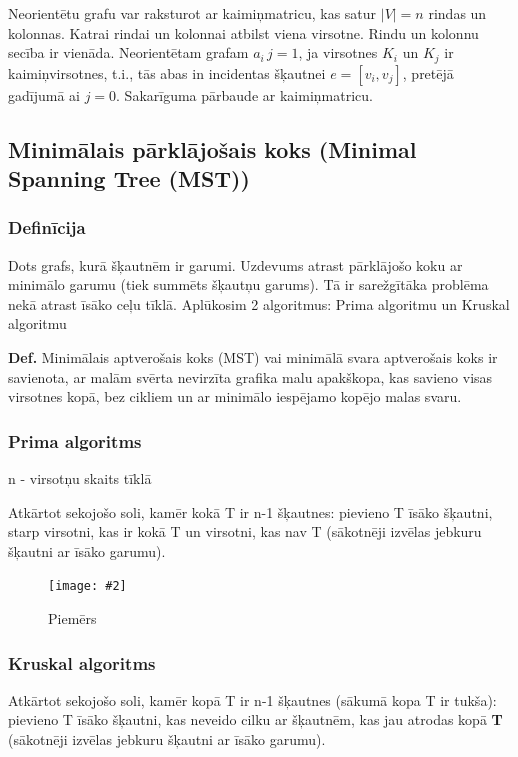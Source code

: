 \documentclass{article}
\newcommand{\illustration}[3]{
	\begin{figure}[H]
		\centering	
		\texttt{[image: \#2]}
		\caption{#3}
	\end{figure}
}
\begin{document}
Neorientētu grafu var raksturot ar kaimiņmatricu, kas satur $|V | = n$ rindas un kolonnas.  Katrai rindai un kolonnai atbilst viena virsotne.  Rindu un kolonnu secība ir vienāda.  Neorientētam grafam $a_i \, j = 1$, ja virsotnes $K_i$ un $K_j$ ir kaimiņvirsotnes, t.i., tās abas in incidentas šķautnei $e = [v_i , v_j ]$, pretējā gadījumā ai $j = 0$.  Sakarīguma pārbaude ar kaimiņmatricu.

\subsection{Minimālais pārklājošais koks (Minimal Spanning Tree (MST))}

\subsubsection{Definīcija}

Dots grafs, kurā šķautnēm ir garumi. Uzdevums atrast pārklājošo koku ar minimālo garumu (tiek summēts šķautņu garums).  Tā ir sarežgītāka problēma nekā atrast īsāko ceļu tīklā. Aplūkosim 2 algoritmus: Prima algoritmu un Kruskal algoritmu

\textbf{Def.} Minimālais aptverošais koks (MST) vai minimālā svara aptverošais koks ir savienota, ar malām svērta nevirzīta grafika malu apakškopa, kas savieno visas virsotnes kopā, bez cikliem un ar minimālo iespējamo kopējo malas svaru.

\subsubsection{Prima algoritms}
n - virsotņu skaits tīklā

Atkārtot sekojošo soli, kamēr kokā T ir n-1 šķautnes: pievieno T īsāko šķautni, starp virsotni, kas ir kokā T un virsotni, kas nav T (sākotnēji izvēlas jebkuru šķautni ar īsāko garumu).

\illustration{1}{prima-1}{Piemērs}

\subsubsection{Kruskal algoritms}

Atkārtot sekojošo soli, kamēr kopā T ir n-1 šķautnes (sākumā kopa T ir tukša): pievieno T īsāko šķautni, kas neveido cilku ar šķautnēm, kas jau atrodas kopā \textbf{T  }(sākotnēji izvēlas jebkuru šķautni ar īsāko garumu).
\end{document}
